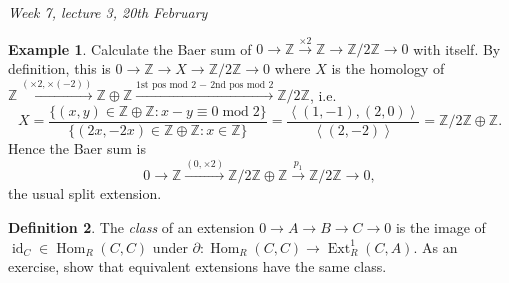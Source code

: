 \documentclass{article}
\newcommand{\la}{\left\langle}
\newcommand{\ra}{\right\rangle}
\newcommand{\Z}{\mathbb{Z}}
\newcommand{\id}{\operatorname{id}}
\newcommand{\Hom}{\operatorname{Hom}}
\newcommand{\Ext}{\operatorname{Ext}}
\newcommand{\Mod}{\operatorname{mod}}
\theoremstyle{definition}
\newtheorem{defn}{Definition}[subsection]
\newtheorem{example}[defn]{Example}
\begin{document}
\begin{flushright}
\textit{Week 7, lecture 3, 20th February}
\end{flushright}

\begin{example}
Calculate the Baer sum of $0\rightarrow\Z\xrightarrow{\times 2}\Z\rightarrow\Z/2\Z\rightarrow 0$ with itself. By definition, this is $0\rightarrow\Z\rightarrow X\rightarrow\Z/2\Z\rightarrow 0$ where $X$ is the homology of $\Z\xrightarrow{(\times 2,\times (-2))}\Z\oplus\Z\xrightarrow{\text{1st pos mod 2 } - \text{ 2nd pos mod 2}}\Z/2\Z$, i.e.
\[
X=\frac{\{(x,y)\in\Z\oplus\Z:x-y\equiv 0\Mod 2\}}{\{(2x,-2x)\in\Z\oplus\Z:x\in\Z\}}=\frac{\la(1,-1),(2,0)\ra}{\la(2,-2)\ra}=\Z/2\Z\oplus\Z.
\]
Hence the Baer sum is
\[
0\rightarrow\Z\xrightarrow{(0,\times 2)}\Z/2\Z\oplus\Z\xrightarrow{p_1}\Z/2\Z\rightarrow 0,
\]
the usual split extension.
\end{example}

\begin{defn}
The \textit{class} of an extension $0\rightarrow A\rightarrow B\rightarrow C\rightarrow 0$ is the image of $\id_C\in\Hom_R(C,C)$ under $\partial:\Hom_R(C,C)\rightarrow\Ext_R^1(C,A)$. As an exercise, show that equivalent extensions have the same class.
\end{defn}
\end{document}
